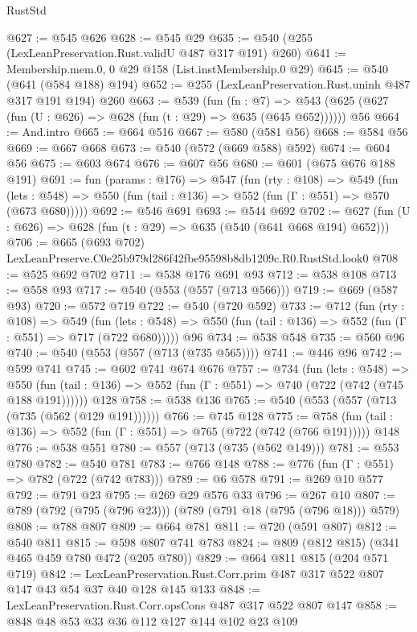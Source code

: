 \begin{lexlean}{RustStd}
\begin{coremodule}
@627 := @545 @626
@628 := @545 @29
@635 := @540 (@255 (LexLeanPreservation.Rust.validU @487 @317 @191) @260)
@641 := Membership.mem.{0, 0} @29 @158 (List.instMembership.{0} @29)
@645 := @540 (@641 (@584 @188) @194)
@652 := @255 (LexLeanPreservation.Rust.uninh @487 @317 @191 @194) @260
@663 := @539
    (fun (fn : @7) =>
    @543 (@625 (@627 (fun (U : @626) => @628 (fun (t : @29) => @635 (@645 @652))))))
    @56
@664 := And.intro
@665 := @664 @516
@667 := @580 (@581 @56)
@668 := @584 @56
@669 := @667 @668
@673 := @540 (@572 (@669 @588) @592)
@674 := @604 @56
@675 := @603 @674
@676 := @607 @56
@680 := @601 (@675 @676 @188 @191)
@691 := fun (params : @176) =>
  @547
    (fun (rty : @108) =>
    @549
      (fun (lets : @548) => @550 (fun (tail : @136) => @552 (fun (Γ : @551) => @570 (@673 @680)))))
@692 := @546 @691
@693 := @544 @692
@702 := @627 (fun (U : @626) => @628 (fun (t : @29) => @635 (@540 (@641 @668 @194) @652)))
@706 := @665 (@693 @702) LexLeanPreserve.C0e25b979d286f42fbe95598b8db1209c.R0.RustStd.look0
@708 := @525 @692 @702
@711 := @538 @176 @691 @93
@712 := @538 @108
@713 := @558 @93
@717 := @540 (@553 (@557 (@713 @566)))
@719 := @669 (@587 @93)
@720 := @572 @719
@722 := @540 (@720 @592)
@733 := @712
    (fun (rty : @108) =>
    @549
      (fun (lets : @548) => @550 (fun (tail : @136) => @552 (fun (Γ : @551) => @717 (@722 @680)))))
    @96
@734 := @538 @548
@735 := @560 @96
@740 := @540 (@553 (@557 (@713 (@735 @565))))
@741 := @446 @96
@742 := @599 @741
@745 := @602 @741 @674 @676
@757 := @734
    (fun (lets : @548) =>
    @550 (fun (tail : @136) => @552 (fun (Γ : @551) => @740 (@722 (@742 (@745 @188 @191))))))
    @128
@758 := @538 @136
@765 := @540 (@553 (@557 (@713 (@735 (@562 (@129 @191))))))
@766 := @745 @128
@775 := @758 (fun (tail : @136) => @552 (fun (Γ : @551) => @765 (@722 (@742 (@766 @191))))) @148
@776 := @538 @551
@780 := @557 (@713 (@735 (@562 @149)))
@781 := @553 @780
@782 := @540 @781
@783 := @766 @148
@788 := @776 (fun (Γ : @551) => @782 (@722 (@742 @783)))
@789 := @6 @578
@791 := @269 @10 @577
@792 := @791 @23
@795 := @269 @29 @576 @33
@796 := @267 @10
@807 := @789 (@792 (@795 (@796 @23))) (@789 (@791 @18 (@795 (@796 @18))) @579)
@808 := @788 @807
@809 := @664 @781
@811 := @720 (@591 @807)
@812 := @540 @811
@815 := @598 @807 @741 @783
@824 := @809 (@812 @815) (@341 @465 @459 @780 @472 (@205 @780))
@829 := @664 @811 @815 (@204 @571 @719)
@842 := LexLeanPreservation.Rust.Corr.prim @487 @317 @522 @807 @147 @43 @54 @37 @40 @128 @145 @133
@848 := LexLeanPreservation.Rust.Corr.opsCons @487 @317 @522 @807 @147
@858 := @848 @48 @53 @33 @36 @112 @127 @144 @102 @23 @109

\end{coremodule}
\end{lexlean}
